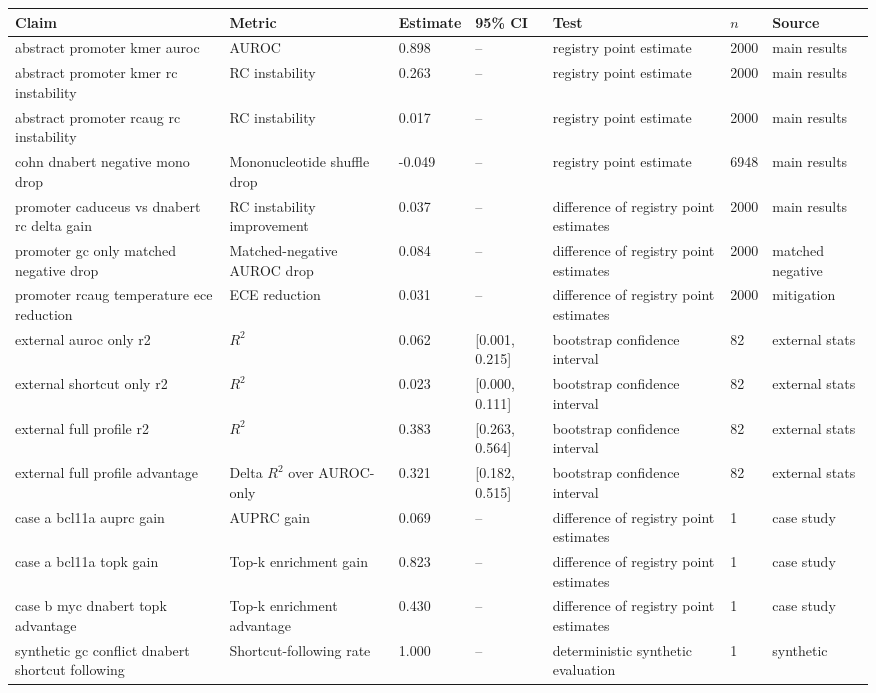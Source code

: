 \begin{tabular}{p{3.2cm}p{3.3cm}p{1.4cm}p{2.2cm}p{2.6cm}p{0.9cm}p{2.4cm}}
\toprule
Claim & Metric & Estimate & 95\% CI & Test & $n$ & Source \\
\midrule
abstract promoter kmer auroc & AUROC & 0.898 & -- & registry point estimate & 2000 & main results \\
abstract promoter kmer rc instability & RC instability & 0.263 & -- & registry point estimate & 2000 & main results \\
abstract promoter rcaug rc instability & RC instability & 0.017 & -- & registry point estimate & 2000 & main results \\
cohn dnabert negative mono drop & Mononucleotide shuffle drop & -0.049 & -- & registry point estimate & 6948 & main results \\
promoter caduceus vs dnabert rc delta gain & RC instability improvement & 0.037 & -- & difference of registry point estimates & 2000 & main results \\
promoter gc only matched negative drop & Matched-negative AUROC drop & 0.084 & -- & difference of registry point estimates & 2000 & matched negative \\
promoter rcaug temperature ece reduction & ECE reduction & 0.031 & -- & difference of registry point estimates & 2000 & mitigation \\
external auroc only r2 & $R^2$ & 0.062 & [0.001, 0.215] & bootstrap confidence interval & 82 & external stats \\
external shortcut only r2 & $R^2$ & 0.023 & [0.000, 0.111] & bootstrap confidence interval & 82 & external stats \\
external full profile r2 & $R^2$ & 0.383 & [0.263, 0.564] & bootstrap confidence interval & 82 & external stats \\
external full profile advantage & Delta $R^2$ over AUROC-only & 0.321 & [0.182, 0.515] & bootstrap confidence interval & 82 & external stats \\
case a bcl11a auprc gain & AUPRC gain & 0.069 & -- & difference of registry point estimates & 1 & case study \\
case a bcl11a topk gain & Top-k enrichment gain & 0.823 & -- & difference of registry point estimates & 1 & case study \\
case b myc dnabert topk advantage & Top-k enrichment advantage & 0.430 & -- & difference of registry point estimates & 1 & case study \\
synthetic gc conflict dnabert shortcut following & Shortcut-following rate & 1.000 & -- & deterministic synthetic evaluation & 1 & synthetic \\
\bottomrule
\end{tabular}

